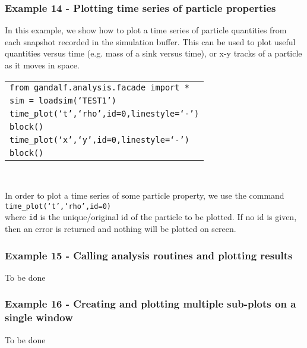 \documentclass[a4paper]{article}
\newcommand{\var}[1]{\texttt{#1}}
\newcommand{\singlecommand}[1]{\\ \newline \indent \var{#1} \\ \newline \noindent}
\begin{document}
\subsubsection{Example  14 - Plotting time series of particle properties}
In this example, we show how to plot a time series of particle quantities from each snapshot recorded in the simulation buffer.  This can be used to plot useful quantities versus time (e.g. mass of a sink versus time), or x-y tracks of a particle as it moves in space. \\

\begin{tabular}{p{14.0cm}}
\var{from gandalf.analysis.facade import *} \\
\var{sim = loadsim(`TEST1')} \\
\var{time\_plot(`t',`rho',id=0,linestyle=`-')} \\
\var{block()} \\
\var{time\_plot(`x',`y',id=0,linestyle=`-')} \\
\var{block()} \\
\end{tabular} \\
\newline

\noindent In order to plot a time series of some particle property, we use the command \singlecommand{time\_plot(`t',`rho',id=0)} where \var{id} is the unique/original id of the particle to be plotted.  If no id is given, then an error is returned and nothing will be plotted on screen.



\subsubsection{Example  15 - Calling analysis routines and plotting results}
To be done



\subsubsection{Example  16 - Creating and plotting multiple sub-plots on a single window}
To be done



\end{document}
